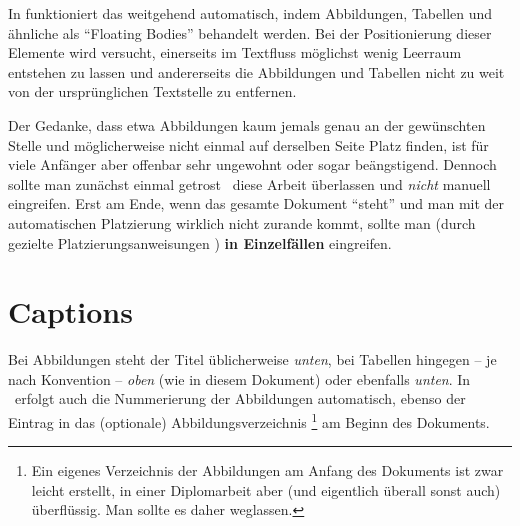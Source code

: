 In \latex funktioniert das weitgehend automatisch, indem
Abbildungen, Tabellen und ähnliche als "`Floating Bodies"'
behandelt werden. Bei der Positionierung dieser Elemente wird
versucht, einerseits im Textfluss möglichst wenig Leer\-raum
entstehen zu lassen und andererseits die Abbildungen und Tabellen
nicht zu weit von der ursprünglichen Textstelle zu entfernen.

Der Gedanke, dass etwa Abbildungen kaum jemals genau an der
ge\-wünsch\-ten Stelle und möglicherweise nicht einmal auf
derselben Seite Platz finden, ist für viele Anfänger aber offenbar sehr
ungewohnt oder sogar beängstigend. Dennoch sollte man zunächst einmal
getrost \latex\ diese Arbeit überlassen und \emph{nicht} manuell
eingreifen. Erst am Ende, wenn das gesamte Dokument "`steht"' und
man mit der automatischen Platzierung wirklich nicht zurande
kommt, sollte man (durch gezielte Platzierungsanweisungen
\cite[S.~33]{Oetiker01}) \textbf{in Einzelfällen} eingreifen.



\section{Captions}

Bei Abbildungen steht der Titel üblicherweise \emph{unten}, bei
Tabellen hingegen -- je nach Konvention -- \emph{oben} (wie in diesem Dokument) 
oder ebenfalls \emph{unten}. In \latex\ erfolgt
auch die Nummerierung der Abbildungen automatisch, ebenso der
Eintrag in das (optionale)
Abbildungsverzeichnis%
\footnote{Ein eigenes Verzeichnis der Abbildungen am Anfang des Dokuments
ist zwar leicht erstellt, in einer Diplomarbeit aber (und eigentlich
überall sonst auch) überflüssig. Man sollte es daher weglassen.}
am Beginn des Dokuments.

